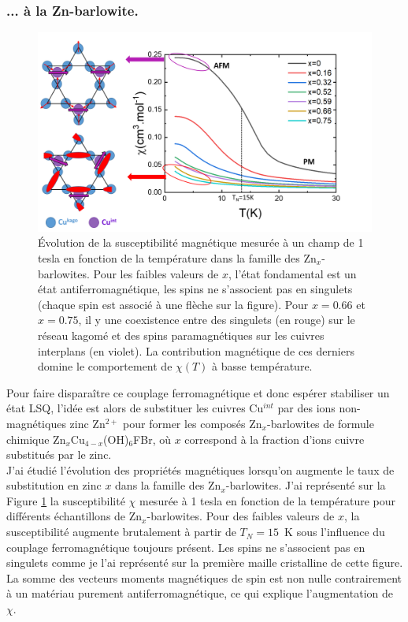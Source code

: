 \subsubsection{... à la Zn-barlowite.}
\begin{figure}[!bht]
\centering
\includegraphics[scale=0.45]{Fig4.png}\caption{\label{fig:SQUID}\'{E}volution de la susceptibilité magnétique mesurée à un champ de 1 tesla en fonction de la température dans la famille des Zn$_x$-barlowites. Pour les faibles valeurs de $x$, l'état fondamental est un état antiferromagnétique, les spins ne s'associent pas en singulets (chaque spin est associé à une flèche sur la figure). Pour $x=0.66$ et $x=0.75$, il y une coexistence entre des singulets (en rouge) sur le réseau kagomé et des spins paramagnétiques sur les cuivres interplans (en violet). La contribution magnétique de ces derniers domine le comportement de $\chi(T)$ à basse température.
}
\end{figure}
Pour faire disparaître ce couplage ferromagnétique et donc espérer stabiliser un état LSQ, l'idée est alors de substituer les cuivres Cu$^{int}$ par des ions non-magnétiques zinc Zn$^{2+}$ pour former les composés Zn$_x$-barlowites de formule chimique Zn$_x$Cu$_{4-x}$(OH)$_6$FBr, où $x$ correspond à la fraction d'ions cuivre substitués par le zinc.\\
J'ai étudié l'évolution des propriétés magnétiques lorsqu'on augmente le taux de substitution en zinc $x$ dans la famille des Zn$_x$-barlowites. J'ai représenté sur la Figure \ref{fig:SQUID} la susceptibilité $\chi$ mesurée à 1 tesla en fonction de la température pour différents échantillons de Zn$_x$-barlowites. Pour des faibles valeurs de $x$, la susceptibilité augmente brutalement à partir de $T_{N}=15$~K sous l'influence du couplage ferromagnétique toujours présent. Les spins ne s'associent pas en singulets comme je l'ai représenté sur la première maille cristalline de cette figure. La somme des vecteurs moments magnétiques de spin est non nulle contrairement à un matériau purement antiferromagnétique, ce qui explique l'augmentation de $\chi$. \\

